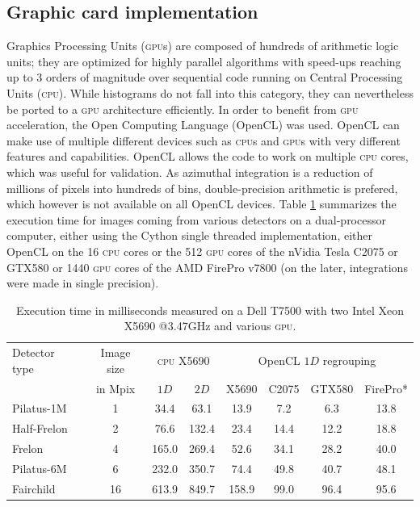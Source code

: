 \documentclass[a4paper]{jpconf}
\begin{document}
\subsection{Graphic card implementation}
Graphics Processing Units (\textsc{gpu}s) are composed of hundreds of
arithmetic logic units; they are optimized for highly
parallel algorithms with speed-ups reaching up to 3 orders of magnitude over sequential
code running on Central Processing Units (\textsc{cpu}).
While histograms do not fall into this category, they can nevertheless be
ported to a \textsc{gpu} architecture efficiently.
In order to benefit from \textsc{gpu} acceleration,
the Open Computing Language\cite{opencl} (OpenCL) was used. OpenCL can make use
of multiple different devices such as \textsc{cpu}s and \textsc{gpu}s with very
different features and capabilities.
OpenCL allows the code to work on multiple \textsc{cpu} cores, which was
useful for validation.
As azimuthal integration is a reduction
of millions of pixels into hundreds of bins, double-precision arithmetic is prefered,
which however is not available on all OpenCL devices.
Table \ref{perfs} summarizes the execution time for images coming from
various detectors on a dual-processor computer, either using the
Cython single threaded implementation, either OpenCL on the 16
\textsc{cpu} cores or the 512 \textsc{gpu} cores of the nVidia Tesla C2075 or
GTX580 or 1440 \textsc{gpu} cores of the AMD FirePro v7800 (on the later,
integrations were made in single precision).

\begin{table}[h]
\caption{\label{perfs}Execution time in milliseconds measured on a
Dell T7500 with two Intel Xeon X5690 @3.47GHz and various \textsc{gpu}.}
\vspace{1mm}
\begin{center}
\begin{tabular}{|l|c||c|c||c|c|c|c|}
\hline
Detector type   & Image size 	& \multicolumn{2}{|c||}{\textsc{cpu} X5690}& \multicolumn{4}{|c|}{OpenCL $1D$ regrouping} \\
					& in Mpix		& $1D$	&	$2D$	&	X5690	&	C2075	&	GTX580	&	FirePro* \\
\hline
Pilatus-1M 			& 1  			& 34.4  &	63.1	&	13.9	&	7.2		&	6.3		&	13.8 \\
Half-Frelon 		& 2  			& 76.6  &   132.4   &	23.4	&	14.4	&	12.2	&	18.8 \\
Frelon 				& 4  			& 165.0	&	269.4   &	52.6	&	34.1	&	28.2	&	40.0 \\
Pilatus-6M 			& 6  			& 232.0	&	350.7	&	74.4	&	49.8	&	40.7	&	48.1 \\
Fairchild 			& 16 			& 613.9	&	849.7   &	158.9	&	99.0	&	96.4	&	95.6 \\
\hline
\end{tabular}
\end{center}
\end{table}
\end{document}
